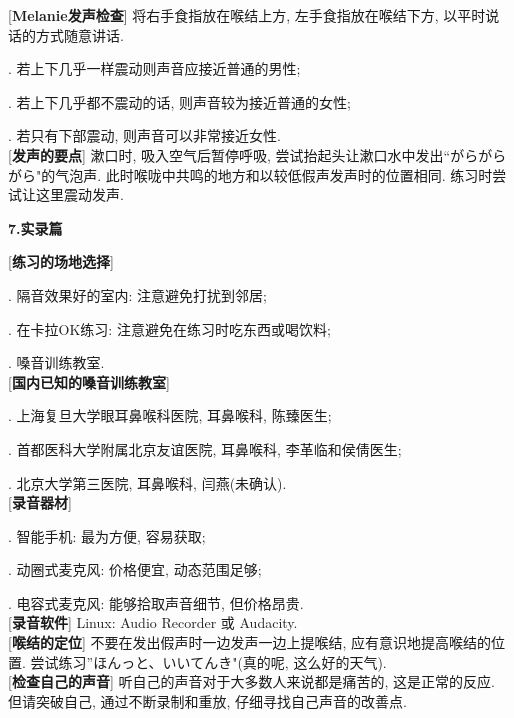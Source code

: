 [\textbf{Melanie发声检查}] 将右手食指放在喉结上方, 左手食指放在喉结下方, 以平时说话的方式随意讲话.\par
{}. 若上下几乎一样震动则声音应接近普通的男性;\par
{}. 若上下几乎都不震动的话, 则声音较为接近普通的女性;\par
{}. 若只有下部震动, 则声音可以非常接近女性.\\

[\textbf{发声的要点}] 漱口时, 吸入空气后暂停呼吸, 尝试抬起头让漱口水中发出``がらがらがら"的气泡声. 此时喉咙中共鸣的地方和以较低假声发声时的位置相同. 练习时尝试让这里震动发声.\\

\clearpage

\begin{center}
 \textbf{7.实录篇}
\end{center}

[\textbf{练习的场地选择}]\par
{}. 隔音效果好的室内: 注意避免打扰到邻居;\par
{}. 在卡拉OK练习: 注意避免在练习时吃东西或喝饮料;\par
{}. 嗓音训练教室.\\

[\textbf{国内已知的嗓音训练教室}]\par
{}. 上海复旦大学眼耳鼻喉科医院, 耳鼻喉科, 陈臻医生;\par
{}. 首都医科大学附属北京友谊医院, 耳鼻喉科, 李革临和侯倩医生;\par
{}. 北京大学第三医院, 耳鼻喉科, 闫燕(未确认).\\

[\textbf{录音器材}]\par
{}. 智能手机: 最为方便, 容易获取;\par
{}. 动圈式麦克风: 价格便宜, 动态范围足够;\par
{}. 电容式麦克风: 能够拾取声音细节, 但价格昂贵.\\

[\textbf{录音软件}] Linux: Audio Recorder 或 Audacity.\\

[\textbf{喉结的定位}] 不要在发出假声时一边发声一边上提喉结, 应有意识地提高喉结的位置. 尝试练习''ほんっと、いいてんき"(真的呢, 这么好的天气).\\

[\textbf{检查自己的声音}] 听自己的声音对于大多数人来说都是痛苦的, 这是正常的反应. 但请突破自己, 通过不断录制和重放, 仔细寻找自己声音的改善点.\\

